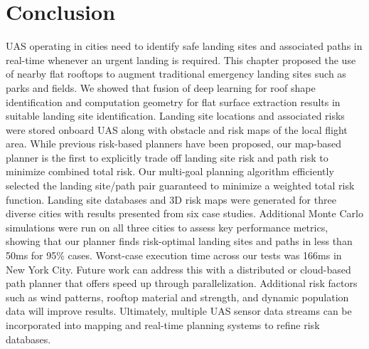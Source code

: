 



\section{Conclusion}\label{sec:ch5_conclusion}

\ac{UAS} operating in cities need to identify safe landing sites and associated paths in real-time whenever an urgent landing is required. This chapter proposed the use of nearby flat rooftops to augment traditional emergency landing sites such as parks and fields. We showed that fusion of deep learning for roof shape identification and computation geometry for flat surface extraction results in suitable landing site identification.  Landing site locations and associated risks were stored onboard \ac{UAS} along with obstacle and risk maps of the local flight area.
While previous risk-based planners have been proposed, our map-based planner is the first to explicitly trade off landing site risk and path risk to minimize combined total risk. Our multi-goal planning algorithm efficiently selected the landing site/path pair guaranteed to minimize a weighted total risk function. Landing site databases and 3D risk maps were generated for three diverse cities with results presented from six case studies. Additional Monte Carlo simulations were run on all three cities to assess key performance metrics, showing that our planner finds risk-optimal landing sites and paths in less than 50ms for 95\% cases. Worst-case execution time across our tests was 166ms in New York City. Future work can address this with a distributed or cloud-based path planner that offers speed up through parallelization. Additional risk factors such as wind patterns, rooftop material and strength, and dynamic population data will improve results. Ultimately, multiple \ac{UAS} sensor data streams can be incorporated into mapping and real-time planning systems to refine risk databases.